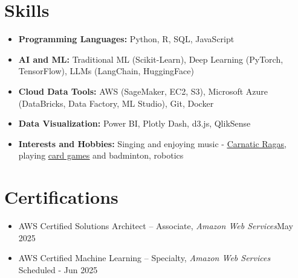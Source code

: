 \documentclass[letterpaper,11pt]{article}
\newcommand{\resumeItem}[1]{
\justifying
  \item{\small{#1}}
  \vspace{-2px}
}
\newcommand{\resumeItemListStart}{
  \vspace{-5pt}
  \begin{itemize}[leftmargin=0.21in, label=\textbullet]
}
\newcommand{\resumeItemListEnd}{\end{itemize}}
\begin{document}
\section{\Large{Skills}}
\vspace{3pt}
\begin{itemize}[leftmargin=0.00in, label={}, itemsep=0pt, parsep=0pt]
    \item{
        \small{\textbf{Programming Languages:}}
        \small{Python, R, SQL, JavaScript} 
        }



    \item{
        \small{\textbf{AI and ML:}}
        \small{Traditional ML (Scikit-Learn), Deep Learning (PyTorch, TensorFlow), LLMs (LangChain, HuggingFace)}
        }

    \item{
        \small{\textbf{Cloud Data Tools:}}
        \small{AWS (SageMaker, EC2, S3), Microsoft Azure (DataBricks, Data Factory, ML Studio), Git, Docker}
        }

    \item{
        \small{\textbf{Data Visualization:}}
        \small{Power BI, Plotly Dash, d3.js, QlikSense}
        }
    \item{
    \small{\textbf{Interests and Hobbies:}}
    \small{Singing and enjoying music - \href{https://vishuragams.pages.dev}{\underline{Carnatic Ragas}}, playing \href{https://vishugp.github.io/Thuruppu/}{\underline{card games}} and badminton, robotics}
    }
\end{itemize}


\vspace{-18pt}
\section{\Large{Certifications}}
\vspace{9pt}
\resumeItemListStart
\resumeItem{AWS Certified Solutions Architect – Associate, \textsl{Amazon Web Services}\hfill{May 2025}}

\resumeItem{\vspace{-6pt}AWS Certified Machine Learning – Specialty, \textsl{Amazon Web Services} \hfill{Scheduled - Jun 2025}}

\resumeItemListEnd
\end{document}

